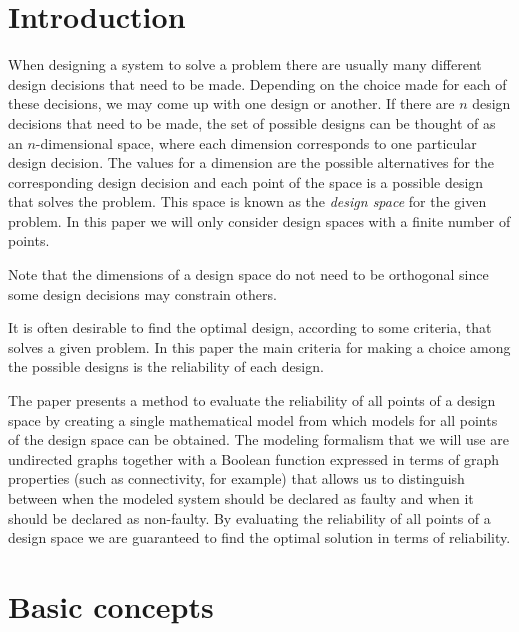 \documentclass[times,a4paper,10pt,twocolumn]{article}
\theoremstyle{definition}
\theoremstyle{definition}
\theoremstyle{plain}
\begin{document}
\begin{abstract}

\end{abstract}







\section{Introduction}

When designing a system to solve a problem there are usually many different
design decisions that need to be made. Depending on the choice made for each of
these decisions, we may come up with one design or another. If there are $n$
design decisions that need to be made, the set of possible designs can be
thought of as an $n$-dimensional space, where each dimension corresponds to one
particular design decision. The values for a dimension are the possible
alternatives for the corresponding design decision and each point of the space
is a possible design that solves the problem. This space is known as the
\emph{design space} for the given problem. In this paper we will only consider
design spaces with a finite number of points.

Note that the dimensions of a design space do not need to be orthogonal since
some design decisions may constrain others.

It is often desirable to find the optimal design, according to some criteria,
that solves a given problem. In this paper the main criteria for making a
choice among the possible designs is the reliability of each design.

The paper presents a method to evaluate the reliability of all points of a
design space by creating a single mathematical model from which models for all
points of the design space can be obtained. The modeling formalism that we will
use are undirected graphs together with a Boolean function expressed in terms
of graph properties (such as connectivity, for example) that allows us to
distinguish between when the modeled system should be declared as faulty and
when it should be declared as non-faulty. By evaluating the reliability of all
points of a design space we are guaranteed to find the optimal solution in
terms of reliability.



\section{Basic concepts}
\end{document}
